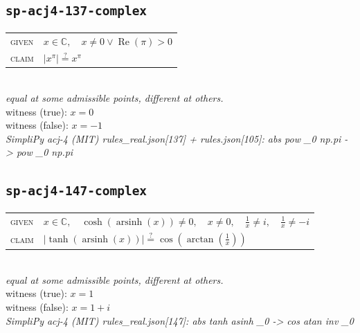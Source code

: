 \documentclass[11pt]{article}
\begin{document}
\subsection*{\texttt{sp-acj4-137-complex}}
\begin{tabular}{@{}l@{\quad}l@{}}
\textsc{given} & $x \in \mathbb{C},\quad x \neq 0 \lor \operatorname{Re}\left(\pi\right) > 0$ \\[4pt]
\textsc{claim} & $\displaystyle \left|x^{\pi}\right| \overset{?}{=} x^{\pi}$ \\
\end{tabular}\\[2pt]
{\small\emph{equal at some admissible points, different at others.}}\\
{\footnotesize\color{gray}witness (true): $x = 0$}\\
{\footnotesize\color{gray}witness (false): $x = -1$}\\
\emph{SimpliPy acj-4 (MIT) rules\_real.json[137] + rules.json[105]: abs pow \_0 np.pi  ->  pow \_0 np.pi}\\

\subsection*{\texttt{sp-acj4-147-complex}}
\begin{tabular}{@{}l@{\quad}l@{}}
\textsc{given} & $x \in \mathbb{C},\quad \cosh\left(\operatorname{arsinh}\left(x\right)\right) \neq 0,\quad x \neq 0,\quad \frac{1}{x} \neq i,\quad \frac{1}{x} \neq -i$ \\[4pt]
\textsc{claim} & $\displaystyle \left|\tanh\left(\operatorname{arsinh}\left(x\right)\right)\right| \overset{?}{=} \cos\left(\arctan\left(\frac{1}{x}\right)\right)$ \\
\end{tabular}\\[2pt]
{\small\emph{equal at some admissible points, different at others.}}\\
{\footnotesize\color{gray}witness (true): $x = 1$}\\
{\footnotesize\color{gray}witness (false): $x = 1 + i$}\\
\emph{SimpliPy acj-4 (MIT) rules\_real.json[147]: abs tanh asinh \_0  ->  cos atan inv \_0}\\
\end{document}
